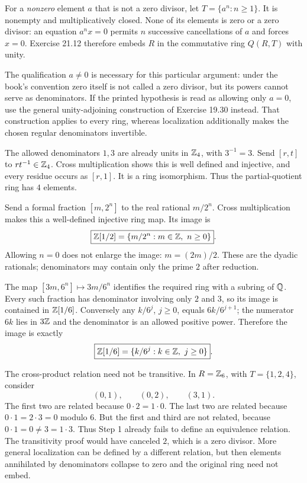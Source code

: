 For a \emph{nonzero} element $a$ that is not a zero divisor, let $T=\{a^n:n\ge1\}$. It is nonempty and multiplicatively closed. None of its elements is zero or a zero divisor: an equation $a^n x=0$ permits $n$ successive cancellations of $a$ and forces $x=0$. Exercise 21.12 therefore embeds $R$ in the commutative ring $Q(R,T)$ with unity.\par
The qualification $a\ne0$ is necessary for this particular argument: under the book's convention zero itself is not called a zero divisor, but its powers cannot serve as denominators. If the printed hypothesis is read as allowing only $a=0$, use the general unity-adjoining construction of Exercise 19.30 instead. That construction applies to every ring, whereas localization additionally makes the chosen regular denominators invertible.

The allowed denominators $1,3$ are already units in $\mathbb{Z}_4$, with $3^{-1}=3$. Send $[r,t]$ to $rt^{-1}\in\mathbb{Z}_4$. Cross multiplication shows this is well defined and injective, and every residue occurs as $[r,1]$. It is a ring isomorphism. Thus the partial-quotient ring has $\boxed4$ elements.

Send a formal fraction $[m,2^n]$ to the real rational $m/2^n$. Cross multiplication makes this a well-defined injective ring map. Its image is
\[\boxed{\Z[1/2]=\{m/2^n:m\in\Z,\ n\ge0\}}.
\]
Allowing $n=0$ does not enlarge the image: $m=(2m)/2$. These are the dyadic rationals; denominators may contain only the prime $2$ after reduction.

The map $[3m,6^n]\mapsto3m/6^n$ identifies the required ring with a subring of $\mathbb{Q}$. Every such fraction has denominator involving only $2$ and $3$, so its image is contained in $\mathbb{Z}[1/6]$. Conversely any $k/6^j$, $j\ge0$, equals $6k/6^{j+1}$; the numerator $6k$ lies in $3\mathbb{Z}$ and the denominator is an allowed positive power. Therefore the image is exactly
\[\boxed{\Z[1/6]=\{k/6^j:k\in\Z,\ j\ge0\}}.
\]

The cross-product relation need not be transitive. In $R=\mathbb{Z}_6$, with $T=\{1,2,4\}$, consider
\[(0,1),\qquad(0,2),\qquad(3,1).
\]
The first two are related because $0\cdot2=1\cdot0$. The last two are related because $0\cdot1=2\cdot3=0$ modulo $6$. But the first and third are not related, because $0\cdot1=0\ne3=1\cdot3$. Thus Step 1 already fails to define an equivalence relation. The transitivity proof would have canceled $2$, which is a zero divisor. More general localization can be defined by a different relation, but then elements annihilated by denominators collapse to zero and the original ring need not embed.
